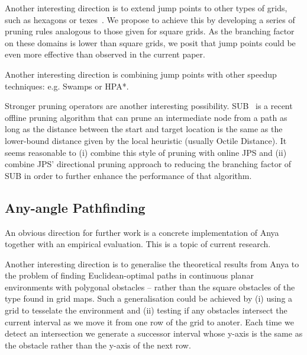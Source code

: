 Another interesting direction is to extend jump points to other types of
grids, such as hexagons or texes~\citep{yap02}. We propose to achieve this by
developing  a series of pruning rules analogous to those given for square
grids.  As the branching factor on these domains is lower than square grids,
we posit that jump points could be even more effective than observed in the
current paper.  

Another interesting direction is combining jump points with
other speedup techniques: e.g. Swamps or HPA*. 

Stronger pruning operators are another interesting possibility. SUB~\cite{urasKH13}
is a recent offline pruning algorithm that can prune an intermediate node from
a path as long as the distance between the start and target location is the same
as the lower-bound distance given by the local heuristic (usually Octile Distance).
It seems reasonable to (i) combine this style of pruning with online JPS and
(ii) combine JPS' directional pruning approach to reducing the branching
factor of SUB in order to further enhance the performance of that algorithm.


\subsection{Any-angle Pathfinding}
An obvious direction for further work is a concrete implementation of Anya
together with an empirical evaluation. This is a topic of current research.

Another interesting direction is to generalise the theoretical results from
Anya to the problem of finding Euclidean-optimal paths in continuous planar
environments with polygonal obstacles -- rather than the square obstacles of
the type found in grid maps. Such a generalisation could be achieved by (i) 
using a grid to tesselate the environment and (ii) testing if any obstacles
intersect the current interval as we move it from one row of the grid to anoter.
Each time we detect an intersection we generate a successor interval whose y-axis
is the same as the obstacle rather than the y-axis of the next row.
